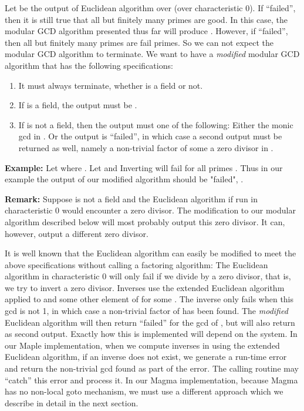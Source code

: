 \documentclass[10pt]{article}
\begin{document}
Let  be the output of
Euclidean algorithm over  (over characteristic 0).
If  ``failed'', then it is still true that all but
finitely many primes are good. In this case, the modular GCD algorithm
presented thus far will produce .
However, if  ``failed'', then all but finitely many primes
are fail primes. So we can not expect the modular GCD algorithm to terminate.
We want to have a {\em modified} modular GCD algorithm that has
the following specifications:

\begin{enumerate}
\item It must always terminate, whether  is a field or not.
\item If  is a field, the output must be .
\item If  is not a field, then the output must one of the
following: Either the monic gcd in . Or the output
is ``failed'', in which case a second output must
be returned as well, namely a non-trivial factor  of some 
a zero divisor in .
\end{enumerate}

\noindent
{\bf Example:} Let  where .
Let  and   Inverting
 will fail for all primes .
Thus in our example the output of our modified algorithm
should be "failed", .

\medskip
\noindent
{\bf Remark:}
Suppose  is not a field and the Euclidean algorithm if run
in characteristic 0 would encounter a zero divisor.  The modification to
our modular algorithm described below will most probably output this zero
divisor.  It can, however, output a different zero divisor.

\medskip
\noindent
It is well known that the Euclidean algorithm can easily be modified
to meet the above specifications without calling a factoring algorithm:
The Euclidean algorithm  in characteristic 0
will only fail if we divide by a zero divisor, that is, we try to
invert a zero divisor.  Inverses use the extended Euclidean algorithm
applied to  and some other element of  for some .
The inverse only fails when this gcd is not 1, in which case a non-trivial
factor  of  has been found.  The {\em modified} Euclidean
algorithm will then return ``failed'' for the gcd of ,
but will also return  as second output.
Exactly how this is implemented will depend on the system.
In our Maple implementation, when we compute inverses in  using
the extended Euclidean algorithm, if an inverse does not exist,
we generate a run-time error and return the non-trivial gcd
found as part of the error.
The calling routine may ``catch'' this error and process it.
In our Magma implementation, because Magma has no non-local goto
mechanism, we must use a different approach which we describe
in detail in the next section.
\end{document}
